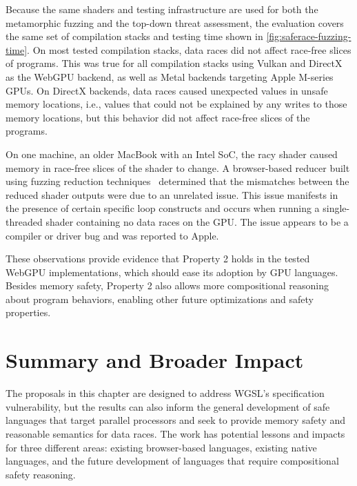 Because the same shaders and testing infrastructure are used for both the metamorphic fuzzing and the top-down threat assessment, the evaluation covers the same set of compilation stacks and testing time shown in \myfig\ref{fig:saferace-fuzzing-time}. On most tested compilation stacks, data races did not affect race-free slices of programs. This was true for all compilation stacks using Vulkan and DirectX as the WebGPU backend, as well as Metal backends targeting Apple M-series GPUs. On DirectX backends, data races caused unexpected values in unsafe memory locations, i.e., values that could not be explained by any writes to those memory locations, but this behavior did not affect race-free slices of the programs.

On one machine, an older MacBook with an Intel SoC, the racy shader caused memory in race-free slices of the shader to change. A browser-based reducer built using fuzzing reduction techniques~\cite{zeller2002deltadebugging,regehr2012creduce} determined that the mismatches between the reduced shader outputs were due to an unrelated issue. This issue manifests in the presence of certain specific loop constructs and occurs when running a single-threaded shader containing no data races on the GPU. The issue appears to be a compiler or driver bug and was reported to Apple.

These observations provide evidence that \smsg Property 2 holds in the tested WebGPU implementations, which should ease its adoption by GPU languages. Besides memory safety, \smsg Property 2 also allows more compositional reasoning about program behaviors, enabling other future optimizations and safety properties.

\section{Summary and Broader Impact \label{sec:saferace-broader-impacts}}

The proposals in this chapter are designed to address WGSL's specification vulnerability, but the results can also inform the general development of safe languages that target parallel processors and seek to provide memory safety and reasonable semantics for data races. The work has potential lessons and impacts for three different areas: existing browser-based languages, existing native languages, and the future development of languages that require compositional safety reasoning.

